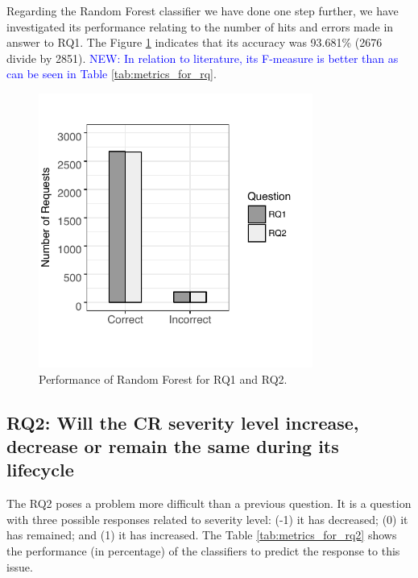 \documentclass[10pt, conference]{IEEEtran}
\newcommand{\new}[1]{\noindent\textcolor{blue}{NEW: {#1}}}
\newcommand{\new}[1]{#1}
\begin{document}
Regarding the Random Forest classifier we have done one step further, we have investigated its performance relating to the number of hits and errors made in answer to RQ1. The Figure \ref{fig:rf_performance_for_q1q2} indicates that its accuracy was 93.681\% (2676 divide by 2851). \new{In relation to literature, its F-measure is better than \cite{Lamkanfi2010, ValdiviaGarcia2014} as can be seen in Table \ref{tab:metrics_for_rq}}.

\begin{figure}[!hbt]
  \includegraphics[height=9cm]{figures/rf_performance_for_q1q2.pdf}
  \caption{Performance of Random Forest for RQ1 and RQ2.}
  \label{fig:rf_performance_for_q1q2}
\end{figure}

\subsection{RQ2: Will the CR severity level increase, decrease or remain the same during its lifecycle}

The RQ2 poses a problem more difficult than a previous question. It is a question with three possible responses related to severity level: (-1) it has decreased; (0)  it has remained; and (1) it has increased. The Table \ref{tab:metrics_for_rq2} shows the performance (in percentage) of the classifiers to predict the response to this issue.
\end{document}
